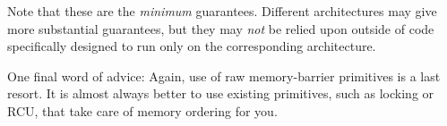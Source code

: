 Note that these are the \emph{minimum} guarantees.
Different architectures may give
more substantial guarantees,
but they may \emph{not}
be relied upon outside of code specifically designed to run only on
the corresponding architecture.

One final word of advice: Again, use of raw memory-barrier primitives is
a last resort.
It is almost always better to use existing primitives, such as locking
or RCU, that take care of memory ordering for you.
